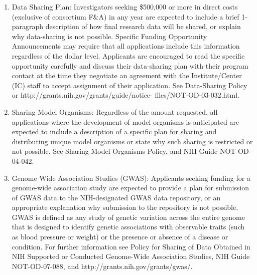 \documentclass[11pt, notitlepage]{article} %
\begin{document}
\begin{enumerate}
	\item{Data Sharing Plan:} Investigators seeking \$500,000 or more in direct costs (exclusive of consortium F\&A) in any year are expected to include a brief 1-paragraph description of how final research data will be shared, or explain why data-sharing is not possible. Specific Funding Opportunity Announcements may require that all applications include this information regardless of the dollar level. Applicants are encouraged to read the specific opportunity carefully and discuss their data-sharing plan with their program contact at the time they negotiate an agreement with the Institute/Center (IC) staff to accept assignment of their application. See Data-Sharing Policy or http://grants.nih.gov/grants/guide/notice- files/NOT-OD-03-032.html.
	\item{Sharing Model Organisms:} Regardless of the amount requested, all applications where the development of model organisms is anticipated are expected to include a description of a specific plan for sharing and distributing unique model organisms or state why such sharing is restricted or not possible. See Sharing Model Organisms Policy, and NIH Guide NOT-OD-04-042.
	\item{Genome Wide Association Studies (GWAS):} Applicants seeking funding for a genome-wide association study are expected to provide a plan for submission of GWAS data to the NIH-designated GWAS data repository, or an appropriate explanation why submission to the repository is not possible. GWAS is defined as any study of genetic variation across the entire genome that is designed to identify genetic associations with observable traits (such as blood pressure or weight) or the presence or absence of a disease or condition. For further information see Policy for Sharing of Data Obtained in NIH Supported or Conducted Genome-Wide Association Studies, NIH Guide NOT-OD-07-088, and http://grants.nih.gov/grants/gwas/.
\end{enumerate}


\newpage

\printbibliography

\end{document}
